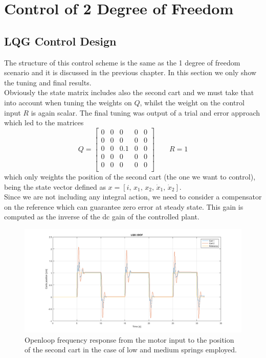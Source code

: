  \chapter{Control of 2 Degree of Freedom}
\section{LQG Control Design}

The structure of this control scheme is the same as the 1 degree of freedom scenario and it is discussed in the previous chapter. In this section we only show the tuning and final results.\\

Obviously the state matrix includes also the second cart and we must take that into account when tuning the weights on $Q$, whilst the weight on the control input $R$ is again scalar. The final tuning was output of a trial and error approach which led to the matrices
\begin{equation}
\renewcommand{\arraystretch}{1}
	Q = 
	\begin{bmatrix}
		0 & 0 & 0 & 0 & 0 \\
		0 & 0 & 0 & 0 & 0 \\
		0 & 0 & 0.1 & 0 & 0 \\
		0 & 0 & 0 & 0 & 0 \\
		0 & 0 & 0 & 0 & 0 \\
	\end{bmatrix}
	\qquad
	R=1
\end{equation}
which only weights the position of the second cart (the one we want to control), being the state vector defined as $x = \left[ i,\, x_1,\, x_2,\, \dot{x}_1,\, \dot{x}_2 \right] $.\\

Since we are not including any integral action, we need to consider a compensator on the reference which can guarantee zero error at steady state. This gain is computed as the inverse of the dc gain of the controlled plant.

\begin{figure}[h]
\centering
\includegraphics[width=0.5\linewidth]{img/lqg_2dof.png}
\caption{Openloop frequency response from the motor input to the position of the second cart in the case of low and medium springs employed.}
\label{fig:lqg2dof}
\end{figure}








